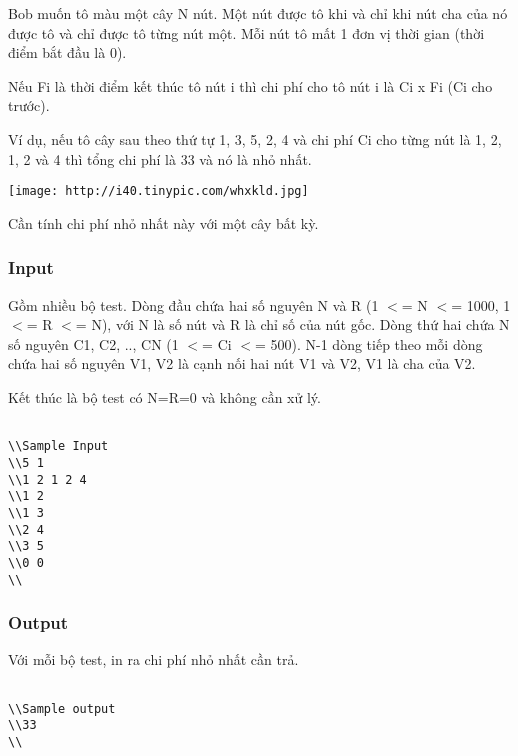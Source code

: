 







   Bob muốn tô màu một cây N nút. Một nút được tô khi và chỉ khi nút cha của nó được tô và chỉ được tô từng nút một. Mỗi nút tô mất 1 đơn vị thời gian (thời điểm bắt đầu là 0).  

   Nếu Fi là thời điểm kết thúc tô nút i thì chi phí cho tô nút i là Ci x Fi (Ci cho trước).  

   Ví dụ, nếu tô cây sau theo thứ tự 1, 3, 5, 2, 4 và chi phí Ci cho từng nút là 1, 2, 1, 2 và 4 thì tổng chi phí là 33 và nó là nhỏ nhất.  

\href{http://tinypic.com}{}


\texttt{[image: http://i40.tinypic.com/whxkld.jpg]}



   Cần tính chi phí nhỏ nhất này với một cây bất kỳ.  

\subsubsection{   Input  }

   Gồm nhiều bộ test. Dòng đầu chứa hai số nguyên N và R (1 $<$= N $<$= 1000, 1 $<$= R $<$= N), với N là số nút và R là chỉ số của nút gốc. Dòng thứ hai chứa N số nguyên C1, C2, .., CN (1 $<$= Ci $<$= 500). N-1 dòng tiếp theo mỗi dòng chứa hai số nguyên V1, V2 là cạnh nối hai nút V1 và V2, V1 là cha của V2.  

   Kết thúc là bộ test có N=R=0 và không cần xử lý.  
\begin{verbatim}

\\Sample Input
\\5 1 
\\1 2 1 2 4 
\\1 2 
\\1 3 
\\2 4 
\\3 5 
\\0 0 
\\\end{verbatim}

\subsubsection{   Output  }

   Với mỗi bộ test, in ra chi phí nhỏ nhất cần trả.  
\begin{verbatim}

\\Sample output
\\33
\\\end{verbatim}

